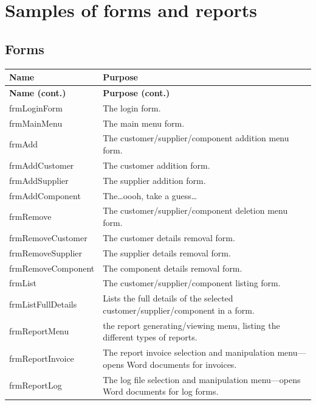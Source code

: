 	\section{Samples of forms and reports}
	
	\subsection{Forms} 
	
	\begin{center}
		\begin{longtable}{ | p{4cm} | p{6cm} | }
			\hline
			\textbf{Name} & \textbf{Purpose}\\
			\endfirsthead
			\hline
			\textbf{Name (cont.)} & \textbf{Purpose (cont.)}\\
			\endhead
			\hline
			frmLoginForm & The login form.\\
			\hline
			frmMainMenu & The main menu form.\\
			\hline
			frmAdd & The customer\slash supplier\slash component addition menu form.\\
			\hline
			frmAddCustomer & The customer addition form.\\
			\hline
			frmAddSupplier & The supplier addition form.\\
			\hline
			frmAddComponent & The\ldots oooh, take a guess\ldots\\
			\hline
			frmRemove & The customer\slash supplier\slash component deletion menu form.\\
			\hline
			frmRemoveCustomer & The customer details removal form.\\
			\hline
			frmRemoveSupplier & The supplier details removal form.\\
			\hline
			frmRemoveComponent & The component details removal form.\\
			\hline
			frmList & The customer\slash supplier\slash component listing form.\\
			\hline
			frmListFullDetails & Lists the full details of the selected customer\slash supplier\slash component in a form.\\
			\hline
			frmReportMenu & the report generating/viewing menu, listing the different types of reports.\\
			\hline
			frmReportInvoice & The report invoice selection and manipulation menu---opens Word documents for invoices.\\
			\hline
			frmReportLog & The log file selection and manipulation menu---opens Word documents for log forms.\\

\end{longtable}
\end{center}
